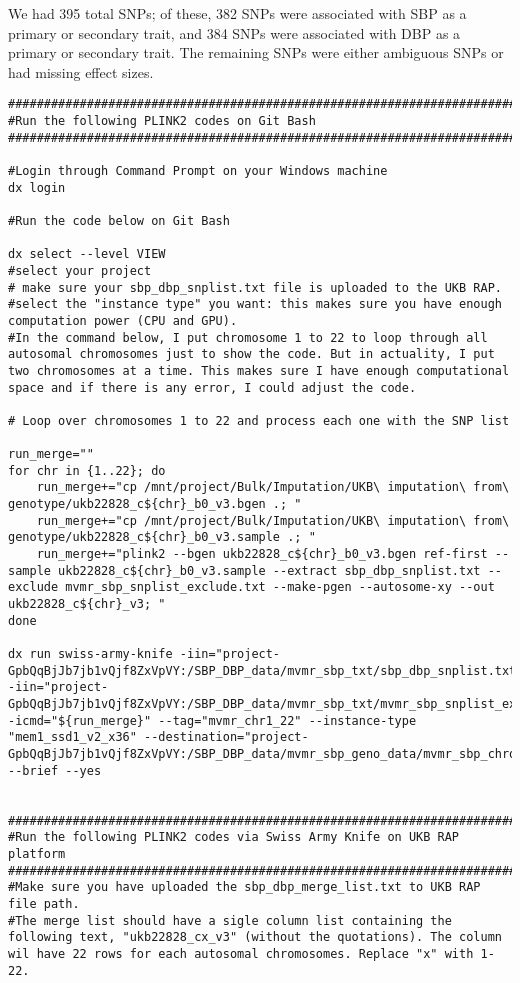 \documentclass[11pt]{article}
\begin{document}
We had 395 total SNPs; of these, 382 SNPs were associated with SBP as a primary or secondary trait, and 384 SNPs were associated with DBP as a primary or secondary trait. The remaining SNPs were either ambiguous SNPs or had missing effect sizes.
\begin{lstlisting}[style=BashStyle]
#########################################################################
#Run the following PLINK2 codes on Git Bash 
#########################################################################

#Login through Command Prompt on your Windows machine 
dx login

#Run the code below on Git Bash
 
dx select --level VIEW 
#select your project
# make sure your sbp_dbp_snplist.txt file is uploaded to the UKB RAP. 
#select the "instance type" you want: this makes sure you have enough computation power (CPU and GPU). 
#In the command below, I put chromosome 1 to 22 to loop through all autosomal chromosomes just to show the code. But in actuality, I put two chromosomes at a time. This makes sure I have enough computational space and if there is any error, I could adjust the code. 

# Loop over chromosomes 1 to 22 and process each one with the SNP list

run_merge=""
for chr in {1..22}; do
    run_merge+="cp /mnt/project/Bulk/Imputation/UKB\ imputation\ from\ genotype/ukb22828_c${chr}_b0_v3.bgen .; "
    run_merge+="cp /mnt/project/Bulk/Imputation/UKB\ imputation\ from\ genotype/ukb22828_c${chr}_b0_v3.sample .; "
    run_merge+="plink2 --bgen ukb22828_c${chr}_b0_v3.bgen ref-first --sample ukb22828_c${chr}_b0_v3.sample --extract sbp_dbp_snplist.txt --exclude mvmr_sbp_snplist_exclude.txt --make-pgen --autosome-xy --out ukb22828_c${chr}_v3; "
done

dx run swiss-army-knife -iin="project-GpbQqBjJb7jb1vQjf8ZxVpVY:/SBP_DBP_data/mvmr_sbp_txt/sbp_dbp_snplist.txt" -iin="project-GpbQqBjJb7jb1vQjf8ZxVpVY:/SBP_DBP_data/mvmr_sbp_txt/mvmr_sbp_snplist_exclude.txt" -icmd="${run_merge}" --tag="mvmr_chr1_22" --instance-type "mem1_ssd1_v2_x36" --destination="project-GpbQqBjJb7jb1vQjf8ZxVpVY:/SBP_DBP_data/mvmr_sbp_geno_data/mvmr_sbp_chromosomes/" --brief --yes


#########################################################################
#Run the following PLINK2 codes via Swiss Army Knife on UKB RAP platform 
#########################################################################
#Make sure you have uploaded the sbp_dbp_merge_list.txt to UKB RAP file path. 
#The merge list should have a sigle column list containing the following text, "ukb22828_cx_v3" (without the quotations). The column wil have 22 rows for each autosomal chromosomes. Replace "x" with 1-22. 


\end{lstlisting}
\end{document}

